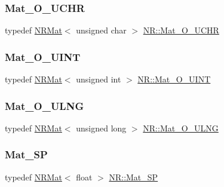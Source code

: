 \mbox{\label{namespaceNR_aaa6b2dfb98d1233de1d71df0c092aced}} 
\subsubsection{\texorpdfstring{Mat\_O\_UCHR}{Mat\_O\_UCHR}}
{\footnotesize\ttfamily typedef \mbox{\hyperlink{classNR_1_1NRMat}{N\+R\+Mat}}$<$ unsigned char $>$ \mbox{\hyperlink{namespaceNR_aaa6b2dfb98d1233de1d71df0c092aced}{N\+R\+::\+Mat\+\_\+\+O\+\_\+\+U\+C\+HR}}}

\mbox{\label{namespaceNR_a538dd5b6ad9cfb6f7196c64e50f67065}} 
\subsubsection{\texorpdfstring{Mat\_O\_UINT}{Mat\_O\_UINT}}
{\footnotesize\ttfamily typedef \mbox{\hyperlink{classNR_1_1NRMat}{N\+R\+Mat}}$<$ unsigned int $>$ \mbox{\hyperlink{namespaceNR_a538dd5b6ad9cfb6f7196c64e50f67065}{N\+R\+::\+Mat\+\_\+\+O\+\_\+\+U\+I\+NT}}}

\mbox{\label{namespaceNR_ac6e0098423dff001af25e38b4ee35ecf}} 
\subsubsection{\texorpdfstring{Mat\_O\_ULNG}{Mat\_O\_ULNG}}
{\footnotesize\ttfamily typedef \mbox{\hyperlink{classNR_1_1NRMat}{N\+R\+Mat}}$<$ unsigned long $>$ \mbox{\hyperlink{namespaceNR_ac6e0098423dff001af25e38b4ee35ecf}{N\+R\+::\+Mat\+\_\+\+O\+\_\+\+U\+L\+NG}}}

\mbox{\label{namespaceNR_aa22c72001d6a0e18146f41e98b9a33af}} 
\subsubsection{\texorpdfstring{Mat\_SP}{Mat\_SP}}
{\footnotesize\ttfamily typedef \mbox{\hyperlink{classNR_1_1NRMat}{N\+R\+Mat}}$<$ float $>$ \mbox{\hyperlink{namespaceNR_aa22c72001d6a0e18146f41e98b9a33af}{N\+R\+::\+Mat\+\_\+\+SP}}}

